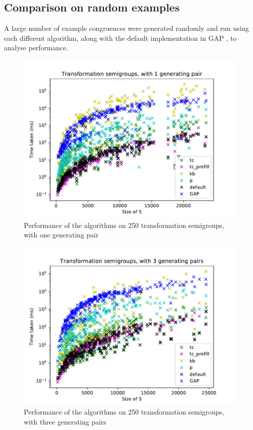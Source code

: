 \subsection{Comparison on random examples}
A large number of example congruences were generated randomly and run using each
different algorithm, along with the default implementation in GAP \cite{gap}, to
analyse performance.

\begin{figure}[h]
  \centering
  \includegraphics[width=\textwidth]{pics/ch-pairs/bench-trans-1p-times}
  \caption[Benchmark: all algorithms, concrete, 1 pair]
  {Performance of the algorithms on 250 transformation semigroups, with
    one generating pair}
  \label{fig:bench-trans-1p-times}
\end{figure}

\begin{figure}[h]
  \centering
  \includegraphics[width=\textwidth]{pics/ch-pairs/bench-trans-3p-times}
  \caption[Benchmark: all algorithms, concrete, 3 pairs]
  {Performance of the algorithms on 250 transformation semigroups, with
    three generating pairs}
  \label{fig:bench-trans-3p-times}
\end{figure}

